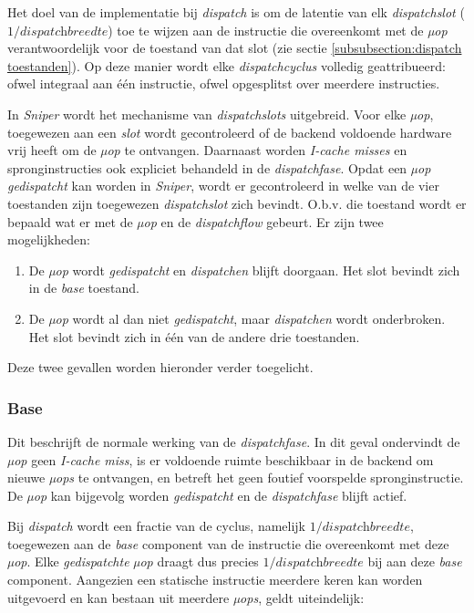 \documentclass[12pt,a4paper,faculty=ea,language=nl]{ugent-doc}
\begin{document}
Het doel van de implementatie bij \textit{dispatch} is om de latentie van elk \textit{dispatchslot} (\(1 / \textit{dispatchbreedte}\)) toe te wijzen aan de instructie die overeenkomt met de \textit{µop} verantwoordelijk voor de toestand van dat slot (zie sectie \ref{subsubsection:dispatch toestanden}).
Op deze manier wordt elke \textit{dispatchcyclus} volledig geattribueerd: ofwel integraal aan één instructie, ofwel opgesplitst over meerdere instructies.

In \textit{Sniper} wordt het mechanisme van \textit{dispatchslots} uitgebreid. Voor elke \textit{µop}, toegewezen aan een \textit{slot} wordt gecontroleerd of de backend voldoende hardware vrij heeft om de \textit{µop} te ontvangen.
Daarnaast worden \textit{I-cache misses} en spronginstructies ook expliciet behandeld in de \textit{dispatchfase}.
Opdat een \textit{µop} \textit{gedispatcht} kan worden in \textit{Sniper}, wordt er gecontroleerd in welke van de vier toestanden zijn toegewezen \textit{dispatchslot} zich bevindt.
O.b.v. die toestand wordt er bepaald wat er met de \textit{µop} en de \textit{dispatchflow} gebeurt. Er zijn twee mogelijkheden:
\begin{enumerate}
    \item De \textit{µop} wordt \textit{gedispatcht} en \textit{dispatchen} blijft doorgaan. Het slot bevindt zich in de \textit{base} toestand.
    \item De \textit{µop} wordt al dan niet \textit{gedispatcht}, maar \textit{dispatchen} wordt onderbroken. Het slot bevindt zich in één van de andere drie toestanden.
\end{enumerate}

Deze twee gevallen worden hieronder verder toegelicht.

\subsubsection{Base}


Dit beschrijft de normale werking van de \textit{dispatchfase}. In dit geval ondervindt de \textit{µop} geen \textit{I-cache miss}, is er voldoende ruimte beschikbaar in de backend om nieuwe \textit{µops} te ontvangen, en betreft het geen foutief voorspelde spronginstructie. De \textit{µop} kan bijgevolg worden \textit{gedispatcht} en de \textit{dispatchfase} blijft actief.

Bij \textit{dispatch} wordt een fractie van de cyclus, namelijk \(1 / \textit{dispatchbreedte}\), toegewezen aan de \textit{base} component van de instructie die overeenkomt met deze \textit{µop}. Elke \textit{gedispatchte} \textit{µop} draagt dus precies $1 / \textit{dispatchbreedte}$ bij aan deze \textit{base} component.
Aangezien een statische instructie meerdere keren kan worden uitgevoerd en kan bestaan uit meerdere \textit{µops}, geldt uiteindelijk:
\end{document}
